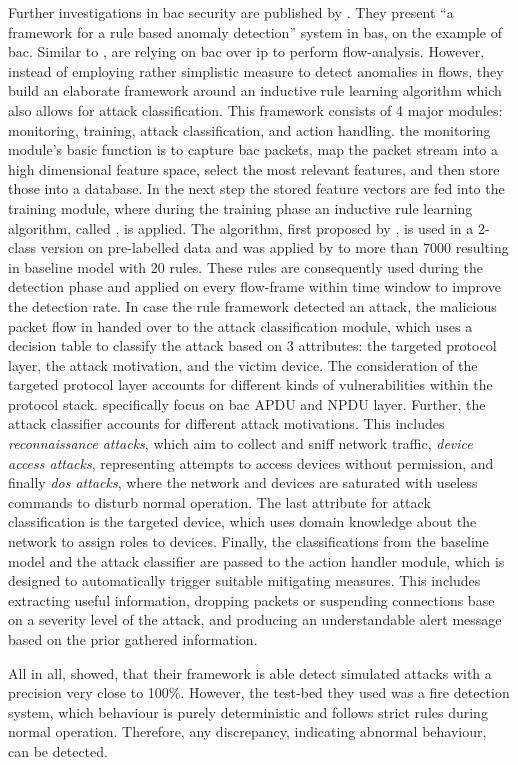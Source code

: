 Further investigations in \gls{bac} security are published by \textcite{Pan2014}. They present \enquote{a framework for a rule based anomaly detection} system in \gls{bas}, on the example of \gls{bac}.
Similar to \textcite{Celeda2012}, \textcite{Pan2014} are relying on \gls{bac} over \gls{ip} to perform flow-analysis.
However, instead of employing rather simplistic measure to detect anomalies in flows, they build an elaborate framework around an inductive rule learning algorithm which also allows for attack classification.
This framework consists of 4 major modules: monitoring, training, attack classification, and action handling.
the monitoring module's basic function is to capture \gls{bac} packets, map the packet stream into a high dimensional feature space, select the most relevant features, and then store those into a database.
In the next step the stored feature vectors are fed into the training module, where during the training phase an inductive rule learning algorithm, called , is applied.
The algorithm, first proposed by \textcite{Cohen1995}, is used in a 2-class version on pre-labelled data and was applied by \textcite{Pan2014} to more than 7000 resulting in baseline model with 20 rules.
These rules are consequently used during the detection phase and applied on every flow-frame within time window to improve the detection rate.
In case the rule framework detected an attack, the malicious packet flow in handed over to the attack classification module, which uses a decision table to classify the attack based on 3 attributes: the targeted protocol layer, the attack motivation, and the victim device.
The consideration of the targeted protocol layer accounts for different kinds of vulnerabilities within the protocol stack. \textcite{Pan2014} specifically focus on \gls{bac} APDU and NPDU layer.
Further, the attack classifier accounts for different attack motivations. This includes \emph{reconnaissance attacks}, which aim to collect and sniff network traffic, \emph{device access attacks}, representing attempts to access devices without permission, and finally \emph{\gls{dos} attacks}, where the network and devices are saturated with useless commands to disturb normal operation.
The last attribute for attack classification is the targeted device, which uses domain knowledge about the network to assign roles to devices.
Finally, the classifications from the baseline model and the attack classifier are passed to the action handler module, which is designed to automatically trigger suitable mitigating measures. This includes extracting useful information, dropping packets or suspending connections base on a severity level of the attack, and producing an understandable alert message based on the prior gathered information.

All in all, \textcite{Pan2014} showed, that their framework is able detect simulated attacks with a precision very close to 100\%. However, the test-bed they used was a fire detection system, which behaviour is purely deterministic and follows strict rules during normal operation.
Therefore, any discrepancy, indicating abnormal behaviour, can be detected.






